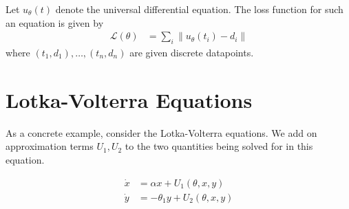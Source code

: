 \documentclass[book.tex]{subfiles}
\begin{document}
Let $u_\theta(t)$ denote the universal differential equation. The loss function for such an equation is given by
\begin{align}
    \mathcal{L}(\theta) &= \sum_i \|u_{\theta}(t_i) - d_i\|
\end{align}
where $(t_1, d_1),\dotsc,(t_n,d_n)$ are given discrete datapoints. 


\section{Lotka-Volterra Equations}

As a concrete example, consider the Lotka-Volterra equations. We add on approximation terms $U_1, U_2$ to the two quantities being solved for in this equation.

\begin{align}
    \dot{x} &= \alpha x + U_1(\theta, x, y) \\
    \dot{y} &= - \theta_1 y + U_2(\theta, x, y)
\end{align}
\end{document}
